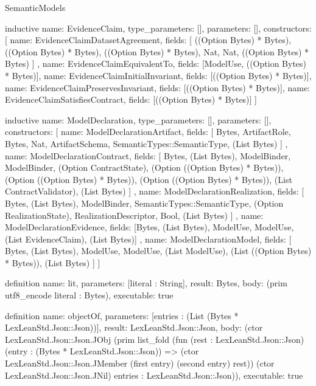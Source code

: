 \begin{lexlean}{SemanticModels}
\begin{semanticmodule}
inductive{
  name: EvidenceClaim,
  type_parameters: [],
  parameters: [],
  constructors: [
    {
      name: EvidenceClaimDatasetAgreement,
      fields: [
        ((Option Bytes) * Bytes),
        ((Option Bytes) * Bytes),
        ((Option Bytes) * Bytes),
        Nat,
        Nat,
        ((Option Bytes) * Bytes)
      ]
    },
    {name: EvidenceClaimEquivalentTo, fields: [ModelUse, ((Option Bytes) * Bytes)]},
    {name: EvidenceClaimInitialInvariant, fields: [((Option Bytes) * Bytes)]},
    {name: EvidenceClaimPreservesInvariant, fields: [((Option Bytes) * Bytes)]},
    {name: EvidenceClaimSatisfiesContract, fields: [((Option Bytes) * Bytes)]}
  ]
}

inductive{
  name: ModelDeclaration,
  type_parameters: [],
  parameters: [],
  constructors: [
    {
      name: ModelDeclarationArtifact,
      fields: [
        Bytes,
        ArtifactRole,
        Bytes,
        Nat,
        ArtifactSchema,
        SemanticTypes::SemanticType,
        (List Bytes)
      ]
    },
    {
      name: ModelDeclarationContract,
      fields: [
        Bytes,
        (List Bytes),
        ModelBinder,
        ModelBinder,
        (Option ContractState),
        (Option ((Option Bytes) * Bytes)),
        (Option ((Option Bytes) * Bytes)),
        (Option ((Option Bytes) * Bytes)),
        (List ContractValidator),
        (List Bytes)
      ]
    },
    {
      name: ModelDeclarationRealization,
      fields: [
        Bytes,
        (List Bytes),
        ModelBinder,
        SemanticTypes::SemanticType,
        (Option RealizationState),
        RealizationDescriptor,
        Bool,
        (List Bytes)
      ]
    },
    {
      name: ModelDeclarationEvidence,
      fields: [Bytes, (List Bytes), ModelUse, ModelUse, (List EvidenceClaim), (List Bytes)]
    },
    {
      name: ModelDeclarationModel,
      fields: [
        Bytes,
        (List Bytes),
        ModelUse,
        ModelUse,
        (List ModelUse),
        (List ((Option Bytes) * Bytes)),
        (List Bytes)
      ]
    }
  ]
}

definition{
  name: lit,
  parameters: [literal : String],
  result: Bytes,
  body: (prim utf8_encode literal : Bytes),
  executable: true
}

definition{
  name: objectOf,
  parameters: [entries : (List (Bytes * LexLeanStd.Json::Json))],
  result: LexLeanStd.Json::Json,
  body: (ctor LexLeanStd.Json::Json.JObj (prim list_fold (fun (rest : LexLeanStd.Json::Json) (entry : (Bytes * LexLeanStd.Json::Json)) => (ctor LexLeanStd.Json::Json.JMember (first entry) (second entry) rest)) (ctor LexLeanStd.Json::Json.JNil) entries : LexLeanStd.Json::Json)),
  executable: true
}


\end{semanticmodule}
\end{lexlean}
